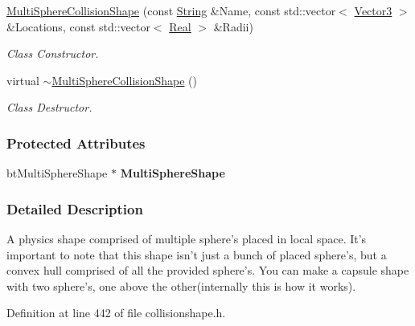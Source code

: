 \begin{DoxyCompactItemize}
\hyperlink{classphys_1_1MultiSphereCollisionShape_aa677ef7e41f2293dc744011cce539c33}{MultiSphereCollisionShape} (const \hyperlink{namespacephys_aa03900411993de7fbfec4789bc1d392e}{String} \&Name, const std::vector$<$ \hyperlink{classphys_1_1Vector3}{Vector3} $>$ \&Locations, const std::vector$<$ \hyperlink{namespacephys_af7eb897198d265b8e868f45240230d5f}{Real} $>$ \&Radii)
\begin{DoxyCompactList}\small\item\em Class Constructor. \item\end{DoxyCompactList}\item 
\hypertarget{classphys_1_1MultiSphereCollisionShape_a8f28813f184d4e3cff9f9027ca304ce8}{
virtual \hyperlink{classphys_1_1MultiSphereCollisionShape_a8f28813f184d4e3cff9f9027ca304ce8}{$\sim$MultiSphereCollisionShape} ()}
\label{classphys_1_1MultiSphereCollisionShape_a8f28813f184d4e3cff9f9027ca304ce8}

\begin{DoxyCompactList}\small\item\em Class Destructor. \item\end{DoxyCompactList}\end{DoxyCompactItemize}
\subsubsection*{Protected Attributes}
\begin{DoxyCompactItemize}
\item 
\hypertarget{classphys_1_1MultiSphereCollisionShape_aade2b9d7d83fd77e858df6dca00a33ff}{
btMultiSphereShape $\ast$ {\bfseries MultiSphereShape}}
\label{classphys_1_1MultiSphereCollisionShape_aade2b9d7d83fd77e858df6dca00a33ff}

\end{DoxyCompactItemize}


\subsubsection{Detailed Description}
A physics shape comprised of multiple sphere's placed in local space. It's important to note that this shape isn't just a bunch of placed sphere's, but a convex hull comprised of all the provided sphere's. You can make a capsule shape with two sphere's, one above the other(internally this is how it works). 

Definition at line 442 of file collisionshape.h.



